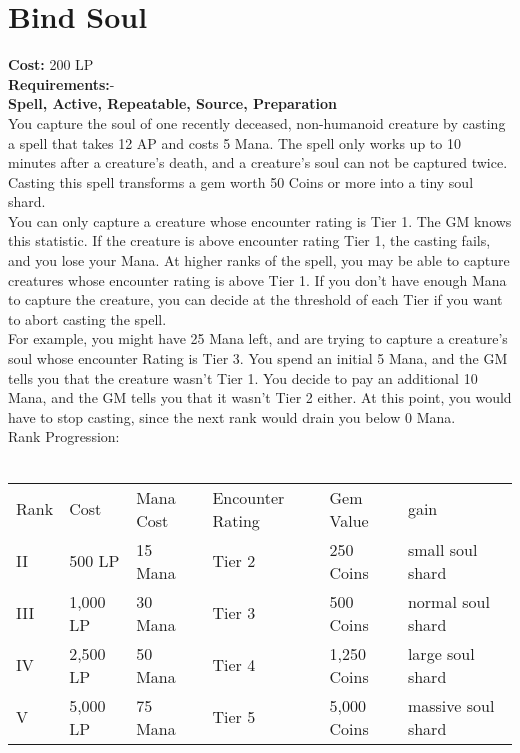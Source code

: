 \section{Bind Soul}\label{spell:bindSoul}
\textbf{Cost:} 200 LP\\
\textbf{Requirements:}-\\
\textbf{Spell, Active, Repeatable, Source, Preparation}\\
You capture the soul of one recently deceased, non-humanoid creature by casting a spell that takes 12 AP and costs 5 Mana.
The spell only works up to 10 minutes after a creature's death, and a creature's soul can not be captured twice.
Casting this spell transforms a gem worth 50 Coins or more into a tiny soul shard.\\
You can only capture a creature whose encounter rating is Tier 1.
The GM knows this statistic.
If the creature is above encounter rating Tier 1, the casting fails, and you lose your Mana.
At higher ranks of the spell, you may be able to capture creatures whose encounter rating is above Tier 1.
If you don't have enough Mana to capture the creature, you can decide at the threshold of each Tier if you want to abort casting the spell.\\
For example, you might have 25 Mana left, and are trying to capture a creature's soul whose encounter Rating is Tier 3.
You spend an initial 5 Mana, and the GM tells you that the creature wasn't Tier 1.
You decide to pay an additional 10 Mana, and the GM tells you that it wasn't Tier 2 either.
At this point, you would have to stop casting, since the next rank would drain you below 0 Mana.
\\
Rank Progression:\\
\\
\begin{longtable}{l | l | l | l | l | l}
    Rank & Cost & Mana Cost & Encounter Rating & Gem Value & gain\\
    II & 500 LP& 15 Mana & Tier 2 & 250 Coins & small soul shard\\
    III & 1,000 LP & 30 Mana & Tier 3 & 500 Coins & normal soul shard\\
    IV & 2,500 LP & 50 Mana & Tier 4 & 1,250 Coins & large soul shard\\
    V & 5,000 LP & 75 Mana & Tier 5 & 5,000 Coins & massive soul shard\\
\end{longtable}